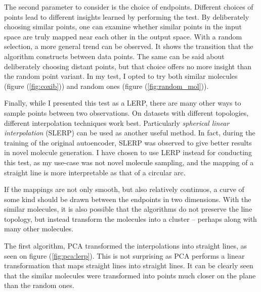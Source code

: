The second parameter to consider is the choice of endpoints. Different choices of points lead to different insights learned by performing the test. By deliberately choosing similar points, one can examine whether similar points in the input space are truly mapped near each other in the output space. With a random selection, a more general trend can be observed. It shows the transition that the algorithm constructs between data points. The same can be said about deliberately choosing distant points, but that choice offers no more insight than the random point variant. In my test, I opted to try both similar molecules (figure (\ref{fig:coxib})) and random ones (figure (\ref{fig:random_mol})).

Finally, while I presented this test as a LERP, there are many other ways to sample points between two observations. On datasets with different topologies, different interpolation techniques work best. Particularly \textit{spherical linear interpolation} (SLERP) can be used as another useful method. In fact, during the training of the original autoencoder, SLERP was observed to give better results in novel molecule generation. \cite{bib:thesis} I have chosen to use LERP instead for conducting this test, as my use-case was not novel molecule sampling, and the mapping of a straight line is more interpretable as that of a circular arc.

If the mappings are not only smooth, but also relatively continuos, a curve of some kind should be drawn between the endpoints in two dimensions. With the similar molecules, it is also possible that the algorithms do not preserve the line topology, but instead transform the molecules into a cluster -- perhaps along with many other molecules. 

The first algorithm, PCA transformed the interpolations into straight lines, as seen on figure (\ref{fig:pca:lerp}). This is not surprising as PCA performs a linear transformation that maps straight lines into straight lines. It can be clearly seen that the similar molecules were transformed into points much closer on the plane than the random ones.

